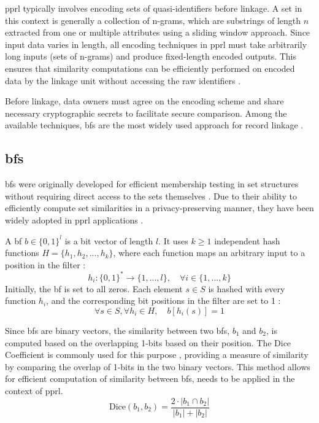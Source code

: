 \ac{pprl} typically involves encoding sets of quasi-identifiers before linkage.
A set in this context is generally a collection of n-grams, which are substrings of length $n$ extracted from one or multiple attributes using a sliding window approach.
Since input data varies in length, all encoding techniques in \ac{pprl} must take arbitrarily long inputs (sets of n-grams) and produce fixed-length encoded outputs.
This ensures that similarity computations can be efficiently performed on encoded data by the linkage unit without accessing the raw identifiers \cite{vidanage2020graph,schaefer2024}.

Before linkage, data owners must agree on the encoding scheme and share necessary cryptographic secrets to facilitate secure comparison.
Among the available techniques, \ac{bf}s are the most widely used approach for record linkage \cite{schaefer2024}.

\subsection{\ac{bf}s} \label{sec:bf}

\ac{bf}s were originally developed for efficient membership testing in set structures without requiring direct access to the sets themselves \cite{bloom1970space}.
Due to their ability to efficiently compute set similarities in a privacy-preserving manner, they have been widely adopted in \ac{pprl} applications \cite{schaefer2024,vidanage2020graph,schnell2009privacy}.

A \ac{bf} $b \in \{0,1\}^l$ is a bit vector of length $l$.
It uses $k \geq 1$ independent hash functions $H = \{h_1, h_2, ..., h_k\}$, where each function maps an arbitrary input to a position in the filter \cite{schaefer2024,schnell2009privacy}:
\begin{equation}
  h_i: \{0,1\}^* \to \{1, ..., l\}, \quad \forall i \in \{1, ..., k\}
\end{equation}
Initially, the \ac{bf} is set to all zeros.
Each element $s \in S$ is hashed with every function $h_i$, and the corresponding bit positions in the filter are set to 1 \cite{schaefer2024,schnell2009privacy}:
\begin{equation}
  \forall s \in S, \forall h_i \in H, \quad b[h_i(s)] = 1
\end{equation}

Since \ac{bf}s are binary vectors, the similarity between two \ac{bf}s, \(b_1\) and \(b_2\), is computed based on the overlapping 1-bits based on their position.
The Dice Coefficient is commonly used for this purpose \cite{schaefer2024}, providing a measure of similarity by comparing the overlap of 1-bits in the two binary vectors.
This method allows for efficient computation of similarity between \ac{bf}s, needs to be applied in the context of \ac{pprl}.
\begin{equation}
  \text{Dice}(b_1, b_2) = \frac{2 \cdot |b_1 \cap b_2|}{|b_1| + |b_2|}
\end{equation}


